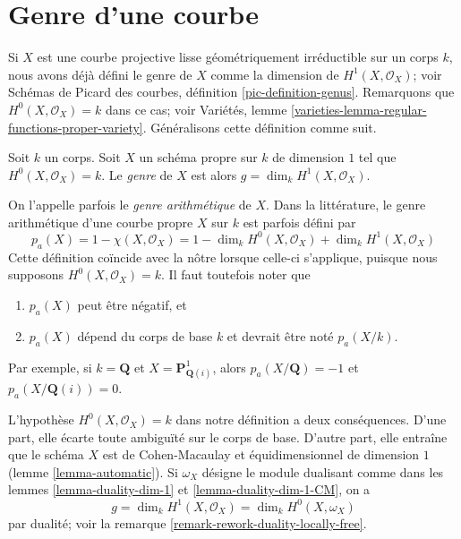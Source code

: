 








\section{Genre d'une courbe}
\label{section-genus}

\noindent
Si $X$ est une courbe projective lisse géométriquement irréductible sur un corps $k$, nous avons déjà défini le genre de $X$ comme la dimension de $H^1(X, \mathcal{O}_X)$; voir Schémas de Picard des courbes, définition \ref{pic-definition-genus}. Remarquons que $H^0(X, \mathcal{O}_X) = k$ dans ce cas; voir Variétés, lemme \ref{varieties-lemma-regular-functions-proper-variety}. Généralisons cette définition comme suit.

\begin{definition}
\label{definition-genus}
Soit $k$ un corps. Soit $X$ un schéma propre sur $k$ de dimension $1$ tel que $H^0(X, \mathcal{O}_X) = k$. Le {\it genre} de $X$ est alors $g = \dim_k H^1(X, \mathcal{O}_X)$.
\end{definition}

\noindent
On l'appelle parfois le {\it genre arithmétique} de $X$. Dans la littérature, le genre arithmétique d'une courbe propre $X$ sur $k$ est parfois défini par $$
p_a(X) = 1 - \chi(X, \mathcal{O}_X) =
1 - \dim_k H^0(X, \mathcal{O}_X) + \dim_k H^1(X, \mathcal{O}_X)
$$ Cette définition coïncide avec la nôtre lorsque celle-ci s'applique, puisque nous supposons $H^0(X, \mathcal{O}_X) = k$. Il faut toutefois noter que \begin{enumerate} \item $p_a(X)$ peut être négatif, et \item $p_a(X)$ dépend du corps de base $k$ et devrait être noté $p_a(X/k)$. \end{enumerate} Par exemple, si $k = \mathbf{Q}$ et $X = \mathbf{P}^1_{\mathbf{Q}(i)}$, alors $p_a(X/\mathbf{Q}) = -1$ et $p_a(X/\mathbf{Q}(i)) = 0$.

\medskip\noindent
L'hypothèse $H^0(X, \mathcal{O}_X) = k$ dans notre définition a deux conséquences. D'une part, elle écarte toute ambiguïté sur le corps de base. D'autre part, elle entraîne que le schéma $X$ est de Cohen-Macaulay et équidimensionnel de dimension $1$ (lemme \ref{lemma-automatic}). Si $\omega_X$ désigne le module dualisant comme dans les lemmes \ref{lemma-duality-dim-1} et \ref{lemma-duality-dim-1-CM}, on a \begin{equation}
\label{equation-genus}
g = \dim_k H^1(X, \mathcal{O}_X) = \dim_k H^0(X, \omega_X)
\end{equation} par dualité; voir la remarque \ref{remark-rework-duality-locally-free}.

